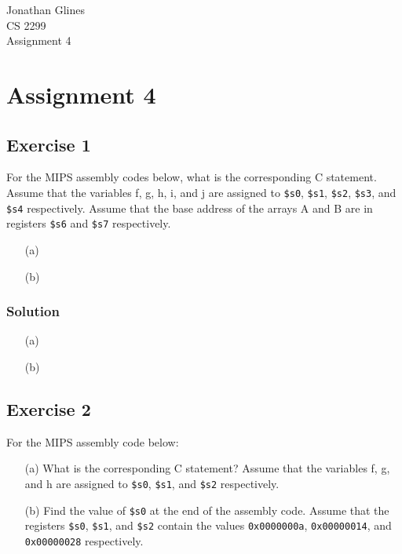 \documentclass[12pt]{article}
\begin{document}
\begin{flushright}
{\Large Jonathan Glines \\
CS 2299 \\
Assignment 4 \\
}
\end{flushright}
\section*{Assignment 4}
\subsection*{Exercise 1}
For the MIPS assembly codes below, what is the corresponding C statement. Assume that the variables f, g, h, i, and j are assigned to {\tt \$s0}, {\tt \$s1}, {\tt \$s2}, {\tt \$s3}, and {\tt \$s4} respectively. Assume that the base address of the arrays A and B are in registers {\tt \$s6} and {\tt \$s7} respectively.
\begin{itemize}
\item[(a)]


\item[(b)]

\end{itemize}
\subsubsection*{Solution}
\begin{itemize}
\item[(a)] 

\item[(b)] 
\end{itemize}

\subsection*{Exercise 2}
For the MIPS assembly code below:
\begin{itemize}
\item[(a)] What is the corresponding C statement? Assume that the variables f, g, and h are assigned to {\tt \$s0}, {\tt \$s1}, and {\tt \$s2} respectively.
\item[(b)] Find the value of {\tt \$s0} at the end of the assembly code. Assume that the registers {\tt \$s0}, {\tt \$s1}, and {\tt \$s2} contain the values {\tt 0x0000000a}, {\tt 0x00000014}, and {\tt 0x00000028} respectively.
\end{itemize}

\end{document}
